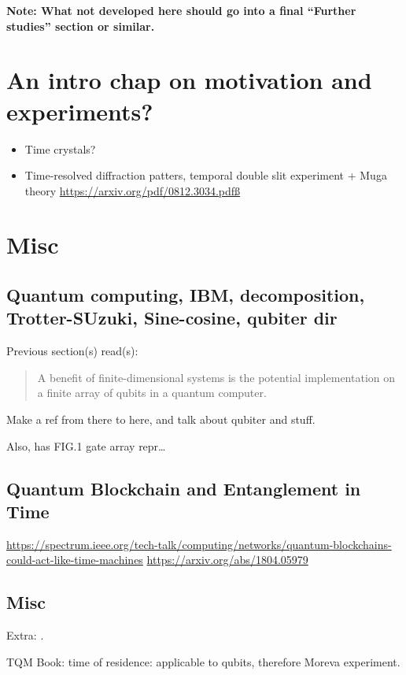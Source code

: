 \textbf{Note: What not developed here should go into a final ``Further studies'' section or similar.}

\section{An intro chap on motivation and experiments?}
\begin{itemize}
  \item Time crystals?
  \item Time-resolved diffraction patters, temporal double slit experiment + Muga theory \url{https://arxiv.org/pdf/0812.3034.pdfß}
\end{itemize}


\section{Misc}

\subsection{Quantum computing, IBM, decomposition, Trotter-SUzuki, Sine-cosine, qubiter dir}

Previous section(s) read(s):
\begin{quote}
  A benefit of finite-dimensional systems is the potential implementation on a finite array of
  qubits in a quantum computer.
\end{quote}
Make a ref from there to here, and talk about qubiter and stuff.

Also, \cite{Moreva:illustration} has FIG.1 gate array repr\dots

\subsection{Quantum Blockchain and Entanglement in Time}

\url{https://spectrum.ieee.org/tech-talk/computing/networks/quantum-blockchains-could-act-like-time-machines}
\url{https://arxiv.org/abs/1804.05979}


\subsection{Misc}

Extra: \cite{TimeAnyons}.

TQM Book: time of residence: applicable to qubits, therefore Moreva experiment.

